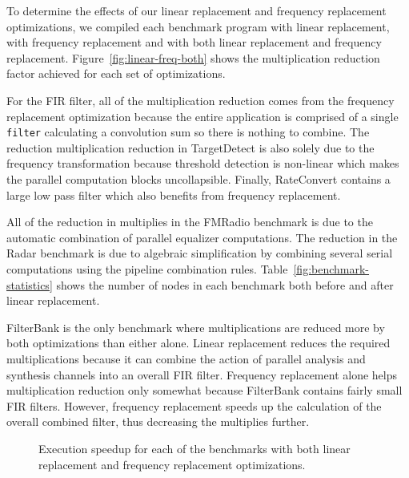 To determine the effects of our linear replacement and frequency replacement 
optimizations, we compiled each benchmark program with linear 
replacement, with frequency replacement and with both linear 
replacement and frequency replacement. 
Figure~\ref{fig:linear-freq-both} shows the multiplication reduction factor 
achieved for each set of optimizations.

For the FIR filter, all of the multiplication reduction comes from the frequency
replacement optimization because the entire application is comprised of a single
{\tt filter} calculating a convolution sum so there is nothing to combine.
The reduction multiplication reduction in TargetDetect is also solely due to 
the frequency transformation because threshold detection is non-linear which
makes the parallel computation blocks uncollapsible. Finally, RateConvert contains
a large low pass filter which also benefits from frequency replacement. 


All of the reduction in multiplies in the FMRadio benchmark is due to
the automatic combination of parallel equalizer computations.
The reduction in the Radar benchmark is due to algebraic  
simplification by combining several serial computations using
the pipeline combination rules. Table~\ref{fig:benchmark-statistics} shows
the number of nodes in each benchmark both before and after linear replacement. 

FilterBank is the only benchmark where multiplications are reduced  
more by both optimizations than either alone. Linear replacement reduces
the required multiplications because it can combine the action of parallel analysis 
and synthesis channels into an overall FIR filter. Frequency replacement alone helps 
multiplication reduction only somewhat because FilterBank contains fairly small FIR filters.
However, frequency replacement speeds up the calculation of the overall combined filter, 
thus decreasing the multiplies further.

\begin{figure}
\center
\epsfxsize=3.2in
\vspace{-6pt}
\caption{Execution speedup for each of the benchmarks with both linear replacement and frequency replacement optimizations.}
\label{fig:execution-speedup}
\vspace{-12pt}
\end{figure}

